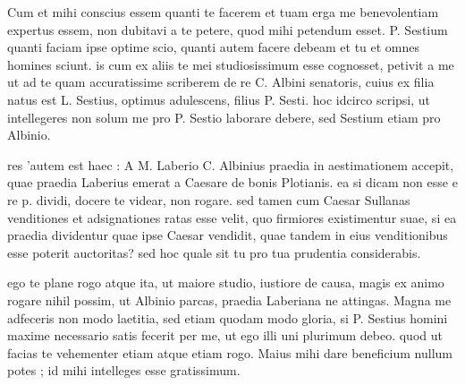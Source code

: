 


 Cum et mihi conscius essem quanti te facerem et tuam erga me benevolentiam expertus essem, non dubitavi a te petere, quod mihi petendum esset. P. Sestium quanti faciam ipse optime scio, quanti autem facere debeam et tu et omnes homines sciunt. is cum ex aliis te mei studiosissimum esse cognosset, petivit a me ut ad te quam accuratissime scriberem de re C. Albini senatoris, cuius ex filia natus est L. Sestius, optimus adulescens, filius P. Sesti. hoc idcirco scripsi, ut intellegeres non solum me pro P. Sestio laborare debere, sed Sestium etiam pro Albinio.

 res 'autem est haec : A M. Laberio C. Albinius praedia in aestimationem accepit, quae praedia Laberius emerat a Caesare de bonis Plotianis. ea si dicam non esse e re p. dividi, docere te videar, non rogare. sed tamen cum Caesar Sullanas venditiones et adsignationes ratas esse velit, quo firmiores existimentur suae, si ea praedia dividentur quae ipse Caesar vendidit, quae tandem in eius venditionibus esse poterit auctoritas? sed hoc quale sit tu pro tua prudentia considerabis.

 ego te plane rogo atque ita, ut maiore studio, iustiore de causa, magis ex animo rogare nihil possim, ut Albinio parcas, praedia Laberiana ne attingas. Magna me adfeceris non modo laetitia, sed etiam quodam modo gloria, si P. Sestius homini maxime necessario satis fecerit per me, ut ego illi uni plurimum debeo. quod ut facias te vehementer etiam atque etiam rogo. Maius mihi dare beneficium nullum potes ; id mihi intelleges esse gratissimum.
